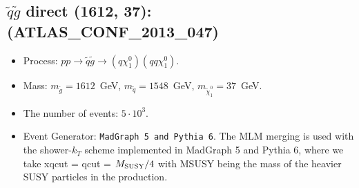 \documentclass[12pt]{article}
\begin{document}
    
\subsection{$\tilde q \tilde g$ direct (1612, 37): (ATLAS\_CONF\_2013\_047)} 


        \begin{itemize}
        \item  Process: $pp \to \tilde q \tilde g \to (q \chi_1^0)(q q \chi_1^0)$.
        \item  Mass: $m_{\tilde g} = 1612$~GeV, $m_{\tilde q} = 1548$~GeV, $m_{\tilde \chi_1^0} = 37$~GeV.
        \item  The number of events: $5 \cdot 10^3$.
        \item  Event Generator: {\tt MadGraph 5 and Pythia 6}.
                The MLM merging is used with the shower-$k_T$ scheme implemented in MadGraph 5 and Pythia 6, where we take xqcut = qcut = $M_{\rm SUSY}/4$ with MSUSY being the mass of the heavier SUSY particles in the production.      
        \end{itemize}    
    
\end{document}
